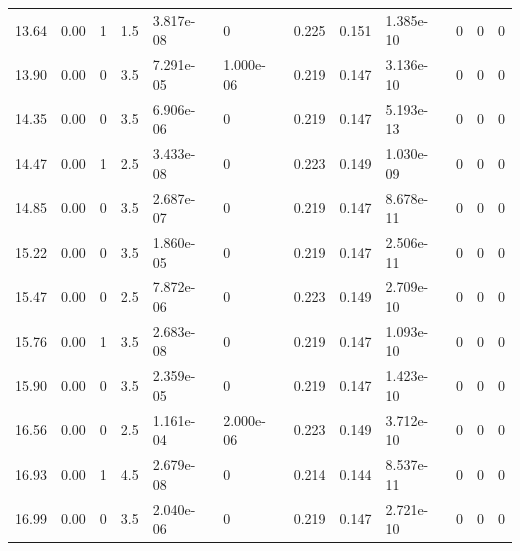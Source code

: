 \documentclass[preview]{standalone}
\begin{document}
{{\begin{tabular}{L{1.2cm}C{1.2cm} C{0.3cm}C{0.5cm} C{1.4cm}C{1.4cm} C{1.4cm}C{1.4cm} C{1.6cm}C{1.6cm} C{1.6cm}C{1.6cm}}
  13.64  &  0.00  & 1     & 1.5 &  3.817e-08  & 0  &  0.225&   0.151& 1.385e-10 & 0   &  0 & 0  \\ 
  13.90  &  0.00  & 0     & 3.5 &  7.291e-05  & 1.000e-06  &  0.219&   0.147& 3.136e-10 & 0   &  0 & 0  \\ 
  14.35  &  0.00  & 0     & 3.5 &  6.906e-06  & 0  &  0.219&   0.147& 5.193e-13 & 0   &  0 & 0  \\ 
  14.47  &  0.00  & 1     & 2.5 &  3.433e-08  & 0  &  0.223&   0.149& 1.030e-09 & 0   &  0 & 0  \\ 
  14.85  &  0.00  & 0     & 3.5 &  2.687e-07  & 0  &  0.219&   0.147& 8.678e-11 & 0   &  0 & 0  \\ 
  15.22  &  0.00  & 0     & 3.5 &  1.860e-05  & 0  &  0.219&   0.147& 2.506e-11 & 0   &  0 & 0  \\ 
  15.47  &  0.00  & 0     & 2.5 &  7.872e-06  & 0  &  0.223&   0.149& 2.709e-10 & 0   &  0 & 0  \\ 
  15.76  &  0.00  & 1     & 3.5 &  2.683e-08  & 0  &  0.219&   0.147& 1.093e-10 & 0   &  0 & 0  \\ 
  15.90  &  0.00  & 0     & 3.5 &  2.359e-05  & 0  &  0.219&   0.147& 1.423e-10 & 0   &  0 & 0  \\ 
  16.56  &  0.00  & 0     & 2.5 &  1.161e-04  & 2.000e-06  &  0.223&   0.149& 3.712e-10 & 0   &  0 & 0  \\ 
  16.93  &  0.00  & 1     & 4.5 &  2.679e-08  & 0  &  0.214&   0.144& 8.537e-11 & 0   &  0 & 0  \\ 
  16.99  &  0.00  & 0     & 3.5 &  2.040e-06  & 0  &  0.219&   0.147& 2.721e-10 & 0   &  0 & 0  \\ 
\hline 
\end{tabular} 

}}
\end{document}
